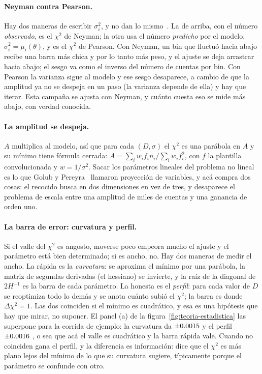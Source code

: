 \documentclass[11pt,a4paper]{article}
\begin{document}
\paragraph{Neyman contra Pearson.} Hay dos maneras de escribir $\sigma_i^2$,
y no dan lo mismo~\cite{baker1984}. La de arriba, con el número
\emph{observado}, es el $\chi^2$ de Neyman; la otra usa el número
\emph{predicho} por el modelo, $\sigma_i^2 = \mu_i(\theta)$, y es el
$\chi^2$ de Pearson. Con Neyman, un bin que fluctuó hacia abajo recibe una
barra más chica y por lo tanto más peso, y el ajuste se deja arrastrar hacia
abajo; el sesgo va como el inverso del número de cuentas por bin. Con Pearson
la varianza sigue al modelo y ese sesgo desaparece, a cambio de que la
amplitud ya no se despeja en un paso (la varianza depende de ella) y hay que
iterar. Esta campaña se ajusta con Neyman, y cuánto cuesta eso se mide más
abajo, con verdad conocida.

\paragraph{La amplitud se despeja.} $A$ multiplica al modelo, así que para
cada $(D, \sigma)$ el $\chi^2$ es una parábola en $A$ y su mínimo tiene
fórmula cerrada: $A = \sum_i w_i f_i n_i / \sum_i w_i f_i^2$, con $f$ la
plantilla convolucionada y $w = 1/\sigma^2$. Sacar los parámetros lineales
del problema no lineal es lo que Golub y Pereyra~\cite{golub1973} llamaron
proyección de variables, y acá compra dos cosas: el recocido busca en dos
dimensiones en vez de tres, y desaparece el problema de escala entre una
amplitud de miles de cuentas y una ganancia de orden uno.

\paragraph{La barra de error: curvatura y perfil.} Si el valle del $\chi^2$
es angosto, moverse poco empeora mucho el ajuste y el parámetro está bien
determinado; si es ancho, no. Hay dos maneras de medir el ancho. La rápida es
la \emph{curvatura}: se aproxima el mínimo por una parábola, la matriz de
segundas derivadas (el hessiano) se invierte, y la raíz de la diagonal de
$2H^{-1}$ es la barra de cada parámetro. La honesta es el \emph{perfil}: para
cada valor de $D$ se reoptimiza todo lo demás y se anota cuánto subió el
$\chi^2$; la barra es donde $\Delta\chi^2 = 1$. Las dos coinciden si el
mínimo es cuadrático, y esa es una hipótesis que hay que mirar, no suponer.
El panel (a) de la figura~\ref{fig:teoria-estadistica} las superpone para la
corrida de ejemplo: la curvatura da $\pm0.0015$ y el perfil
$\pm0.0016$ \DkeV, o sea que acá el valle es cuadrático y la barra
rápida vale. Cuando no coinciden gana el perfil, y la diferencia es
información: dice que el $\chi^2$ es más plano lejos del mínimo de lo que su
curvatura sugiere, típicamente porque el parámetro se confunde con otro.
\end{document}
